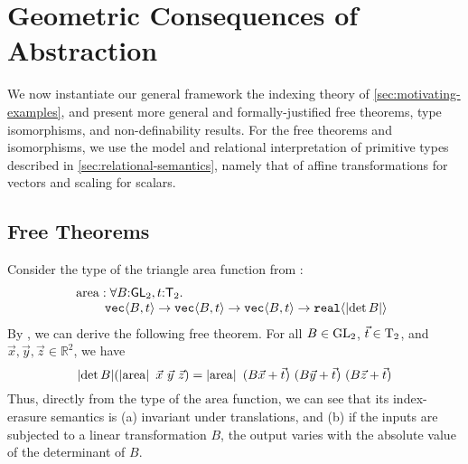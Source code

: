 \section{Geometric Consequences of Abstraction}
\label{sec:instantiations}
We now instantiate our general framework %
the indexing theory of \autoref{sec:motivating-examples}, and present
more general and formally-justified free theorems, type isomorphisms,
and non-definability results.  For the free theorems and isomorphisms,
we use the model and relational interpretation of primitive types
described in \autoref{sec:relational-semantics}, namely that of
affine transformations for vectors and scaling for scalars.


\subsection{Free Theorems}
\label{sec:theorems-for-free}

Consider the type of the triangle area %
function from
:
\begin{displaymath}
  \begin{array}{@{}l}
    \mathrm{area} : \forall B\mathord:\SynGL{2}, t\mathord:\SynTransl{2}.\ \\
    \hspace{0.8cm}\tyPrim{vec}{B, t} \to \tyPrim{vec}{B, t} \to \tyPrim{vec}{B, t} \to \tyPrim{real}{\abs{\det B}}
  \end{array}
\end{displaymath}
By , we can derive the following free theorem. For all $B \in \mathrm{GL}_2$, $\vec{t} \in \mathrm{T}_2$, and $\vec{x}, \vec{y}, \vec{z} \in \mathbb{R}^2$, we have 
\begin{displaymath}
  \abs{\det B}(\tmSem{\mathrm{area}}\ \vec{x}\ \vec{y}\ \vec{z}) = \tmSem{\mathrm{area}}\ (B\vec{x} + \vec{t})\ (B\vec{y} + \vec{t})\ (B\vec{z} + \vec{t})
\end{displaymath}
Thus, directly from the type of the $\mathrm{area}$ function, we can
see that its index-erasure semantics is (a) invariant under
translations, and (b) if the inputs are subjected to a linear
transformation $B$, the output varies with the absolute value of the
determinant of $B$.




